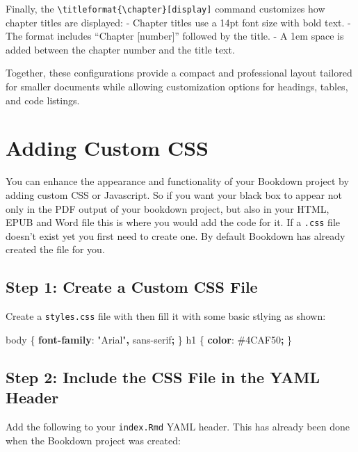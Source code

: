 \documentclass[
]{book}
\newenvironment{Shaded}{\begin{snugshade}}{\end{snugshade}}
\newcommand{\CharTok}[1]{\textcolor[rgb]{0.31,0.60,0.02}{#1}}
\newcommand{\ConstantTok}[1]{\textcolor[rgb]{0.56,0.35,0.01}{#1}}
\newcommand{\DecValTok}[1]{\textcolor[rgb]{0.00,0.00,0.81}{#1}}
\newcommand{\KeywordTok}[1]{\textcolor[rgb]{0.13,0.29,0.53}{\textbf{#1}}}
\newcommand{\NormalTok}[1]{#1}
\newcommand{\OperatorTok}[1]{\textcolor[rgb]{0.81,0.36,0.00}{\textbf{#1}}}
\newcommand{\StringTok}[1]{\textcolor[rgb]{0.31,0.60,0.02}{#1}}
\theoremstyle{definition}
\theoremstyle{definition}
\theoremstyle{definition}
\theoremstyle{definition}
\theoremstyle{remark}
\begin{document}
Finally, the \texttt{\textbackslash{}titleformat\{\textbackslash{}chapter\}{[}display{]}} command customizes how chapter titles are displayed:
- Chapter titles use a 14pt font size with bold text.
- The format includes ``Chapter {[}number{]}'' followed by the title.
- A 1em space is added between the chapter number and the title text.

Together, these configurations provide a compact and professional layout tailored for smaller documents while allowing customization options for headings, tables, and code listings.

\section{Adding Custom CSS}\label{adding-custom-css}

You can enhance the appearance and functionality of your Bookdown project by adding custom CSS or Javascript. So if you want your black box to appear not only in the PDF output of your bookdown project, but also in your HTML, EPUB and Word file this is where you would add the code for it. If a \texttt{.css} file doesn't exist yet you first need to create one. By default Bookdown has already created the file for you.

\subsection{Step 1: Create a Custom CSS File}\label{step-1-create-a-custom-css-file}

Create a \texttt{styles.css} file with then fill it with some basic stlying as shown:

\begin{Shaded}
\begin{Highlighting}[]
\NormalTok{body \{}
  \KeywordTok{font{-}family}\CharTok{:} \StringTok{"Arial"}\OperatorTok{,} \DecValTok{sans{-}serif}\OperatorTok{;}
\NormalTok{\}}
\NormalTok{h1 \{}
  \KeywordTok{color}\CharTok{:} \ConstantTok{\#4CAF50}\OperatorTok{;}
\NormalTok{\}}
\end{Highlighting}
\end{Shaded}

\subsection{Step 2: Include the CSS File in the YAML Header}\label{step-2-include-the-css-file-in-the-yaml-header}

Add the following to your \texttt{index.Rmd} YAML header. This has already been done when the Bookdown project was created:
\end{document}
